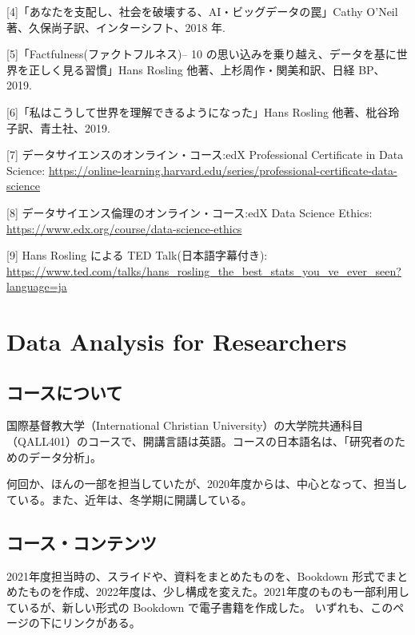 \documentclass[
]{bxjsbook}
\theoremstyle{definition}
\theoremstyle{definition}
\theoremstyle{definition}
\theoremstyle{definition}
\theoremstyle{remark}
\begin{document}
{[}4{]}「あなたを支配し、社会を破壊する、AI・ビッグデータの罠」Cathy O'Neil 著、久保尚子訳、インターシフト、2018 年.

{[}5{]}「Factfulness(ファクトフルネス)-- 10 の思い込みを乗り越え、データを基に世界を正しく見る習慣」Hans
Rosling 他著、上杉周作・関美和訳、日経 BP、2019.

{[}6{]}「私はこうして世界を理解できるようになった」Hans Rosling 他著、枇谷玲子訳、青土社、2019.

{[}7{]} データサイエンスのオンライン・コース:edX Professional Certificate in Data Science:
\url{https://online-learning.harvard.edu/series/professional-certificate-data-science}

{[}8{]} データサイエンス倫理のオンライン・コース:edX Data Science Ethics: \url{https://www.edx.org/course/data-science-ethics}

{[}9{]} Hans Rosling による TED Talk(日本語字幕付き): \url{https://www.ted.com/talks/hans_rosling_the_best_stats_you_ve_ever_seen?language=ja}

\hypertarget{da4r}{%
\section{Data Analysis for Researchers}\label{da4r}}

\hypertarget{ux30b3ux30fcux30b9ux306bux3064ux3044ux3066}{%
\subsection{コースについて}\label{ux30b3ux30fcux30b9ux306bux3064ux3044ux3066}}

国際基督教大学（International Christian University）の大学院共通科目（QALL401）のコースで、開講言語は英語。コースの日本語名は、「研究者のためのデータ分析」。

何回か、ほんの一部を担当していたが、2020年度からは、中心となって、担当している。また、近年は、冬学期に開講している。

\hypertarget{ux30b3ux30fcux30b9ux30b3ux30f3ux30c6ux30f3ux30c4}{%
\subsection{コース・コンテンツ}\label{ux30b3ux30fcux30b9ux30b3ux30f3ux30c6ux30f3ux30c4}}

2021年度担当時の、スライドや、資料をまとめたものを、Bookdown 形式でまとめたものを作成、2022年度は、少し構成を変えた。2021年度のものも一部利用しているが、新しい形式の Bookdown で電子書籍を作成した。
いずれも、このページの下にリンクがある。
\end{document}
